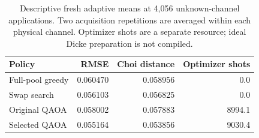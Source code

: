 \begin{table}[htbp]
\centering
\begin{tabular}{lrrr}
\toprule
Policy & RMSE & Choi distance & Optimizer shots \\
\midrule
Full-pool greedy & 0.060470 & 0.058956 & 0.0 \\
Swap search & 0.056103 & 0.056825 & 0.0 \\
Original QAOA & 0.058002 & 0.057883 & 8994.1 \\
Selected QAOA & 0.055164 & 0.053856 & 9030.4 \\
\bottomrule
\end{tabular}
\caption{Descriptive fresh adaptive means at 4,056 unknown-channel applications. Two acquisition repetitions are averaged within each physical channel. Optimizer shots are a separate resource; ideal Dicke preparation is not compiled.}
\label{tab:fresh-tomography}
\end{table}
